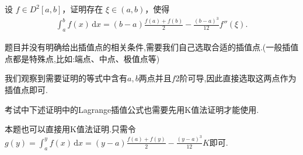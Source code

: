 \documentclass[../../main.tex]{subfiles}
\begin{document}
\begin{example}
设 $f \in D^2[a,b]$，证明存在 $\xi \in (a,b)$，使得
\begin{align*}
\int_{a}^{b} f(x) \, \mathrm{d}x = (b - a) \frac{f(a) + f(b)}{2} - \frac{(b - a)^3}{12} f''(\xi).
\end{align*}
\end{example}
\begin{note}
题目并没有明确给出插值点的相关条件,需要我们自己选取合适的插值点.(一般插值点都是特殊点,比如:端点、中点、极值点等)

我们观察到需要证明的等式中含有$a,b$两点并且$f$2阶可导,因此直接选取这两点作为插值点即可.
\end{note}
\begin{remark}
考试中下述证明中的Lagrange插值公式也需要先用K值法证明才能使用.

本题也可以直接用K值法证明.只需令$g(y)=\int_a^y{f(x)\,\mathrm{d}x}=(y-a)\frac{f(a)+f(y)}{2}-\frac{(y-a)^3}{12}K$即可.
\end{remark}
\end{document}
